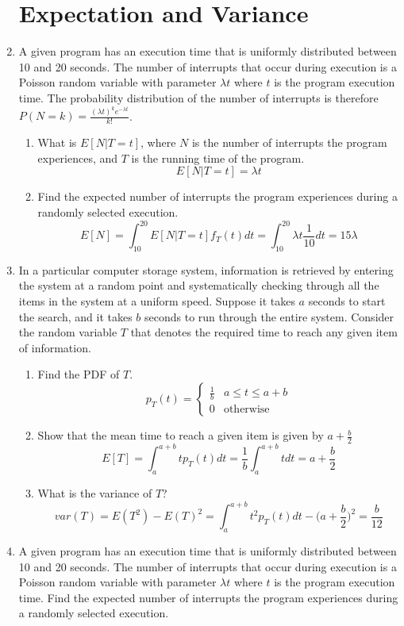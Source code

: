 \documentclass[10.5pt,letterpaper]{article}
\begin{document}
\begin{enumerate}[label=\textbf{Problem \arabic*.}]
\section{Expectation and Variance}
\item A given program has an execution time that is uniformly distributed between 10 and 20 seconds. The number of interrupts that occur during execution is a Poisson random variable with parameter $\lambda t$ where $t$ is the program execution time. The probability distribution of the number of interrupts is therefore $P(N=k)=\frac{(\lambda t)^ke^{-\lambda t}}{k!}$.
	\begin{enumerate}[label=(\alph*)]
	\item What is $E[N|T=t]$, where $N$ is the number of interrupts the program experiences, and $T$ is the running time of the program.
	\[E[N|T=t]=\lambda t\]
	\item Find the expected number of interrupts the program experiences during a randomly selected execution.
	\[E[N]=\int_{10}^{20}E[N|T=t]f_T(t)dt = \int_{10}^{20}\lambda t\frac{1}{10}dt=15\lambda\]
	\end{enumerate}
\item In a particular computer storage system, information is retrieved by entering the system at a random point and systematically checking through all the items in the system at a uniform speed. Suppose it takes $a$ seconds to start the search, and it takes $b$ seconds to run through the entire system. Consider the random variable $T$ that denotes the required time to reach any given item of information.
	\begin{enumerate}[label=(\alph*)]
	\item Find the PDF of $T$.
	\[p_T(t) = 
	\begin{cases}
	\frac{1}{b} & a \leq t \leq a + b \\
	0 & \text{otherwise}
	\end{cases}\]
	\item Show that the mean time to reach a given item is given by $a+\frac{b}{2}$
	\[E[T]=\int_{a}^{a+b}tp_T(t)dt=\frac{1}{b}\int_a^{a+b}tdt=a+\frac{b}{2}\]
	\item What is the variance of $T$?
	\[var(T)=E(T^2)-E(T)^2 = \int_a^{a+b}t^2p_T(t)dt-\bigg(a+\frac{b}{2}\bigg)^2=\frac{b}{12}\]
	\end{enumerate}
\item A given program has an execution time that is uniformly distributed between 10 and 20 seconds. The number of interrupts that occur during execution is a Poisson random variable with parameter $\lambda t$ where $t$ is the program execution time. Find the expected number of interrupts the program experiences during a randomly selected execution.

\end{enumerate}
\end{document}
